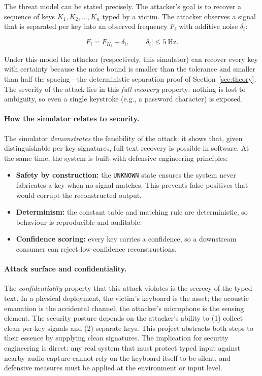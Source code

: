 \documentclass[11pt,a4paper]{article}
\newcommand{\Key}[1]{\texttt{#1}}
\begin{document}
The threat model can be stated precisely. The attacker's goal is to recover a
sequence of keys $K_1, K_2, \ldots, K_n$ typed by a victim. The attacker
observes a signal that is separated per key into an observed frequency $F_i$
with additive noise $\delta_i$:

\[
F_i = F_{K_i} + \delta_i, \qquad |\delta_i| \le 5\ \text{Hz}.
\]

Under this model the attacker (respectively, this simulator) can recover every
key with certainty because the noise bound is smaller than the tolerance and
smaller than half the spacing---the deterministic separation proof of
Section~\ref{sec:theory}. The severity of the attack lies in this
\emph{full-recovery} property: nothing is lost to ambiguity, so even a single
keystroke (e.g., a password character) is exposed.

\paragraph{How the simulator relates to security.}
The simulator \emph{demonstrates} the feasibility of the attack: it shows that,
given distinguishable per-key signatures, full text recovery is possible in
software. At the same time, the system is built with defensive engineering
principles:

\begin{itemize}
    \item \textbf{Safety by construction:} the \Key{UNKNOWN} state ensures the
          system never fabricates a key when no signal matches. This prevents
          false positives that would corrupt the reconstructed output.
    \item \textbf{Determinism:} the constant table and matching rule are
          deterministic, so behaviour is reproducible and auditable.
    \item \textbf{Confidence scoring:} every key carries a confidence, so a
          downstream consumer can reject low-confidence reconstructions.
\end{itemize}

\paragraph{Attack surface and confidentiality.}
The \emph{confidentiality} property that this attack violates is the secrecy of
the typed text. In a physical deployment, the victim's keyboard is the asset;
the acoustic emanation is the accidental channel; the attacker's microphone is
the sensing element. The security posture depends on the attacker's ability to
(1) collect clean per-key signals and (2) separate keys. This project abstracts
both steps to their essence by supplying clean signatures. The implication for
security engineering is direct: any real system that must protect typed input
against nearby audio capture cannot rely on the keyboard itself to be silent,
and defensive measures must be applied at the environment or input level.
\end{document}
